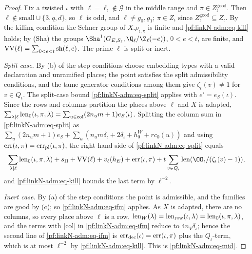 \begin{proof}
Fix a twisted $\iota$ with $\ell=\ell_\iota\notin\mathcal G$ in the middle range and $\pi\in Z^{\mathrm{good}}_\iota$. Then
$\ell\notin\mathrm{small}\cup\{3,q,d\}$, so $\ell$ is odd, and $\ell\ne g_0,g_1$; $\pi\in Z_\iota$ since
$Z^{\mathrm{good}}_\iota\subseteq Z_\iota$. By the killing condition the Selmer group of $X.\rho_{\iota,\pi}$ is finite and
\eqref{pf:linkN-adm:eq-kill} holds; by (Sha) the groups $\Sha^1(G_{E,S_\ell},\Q_\ell/\Z_\ell(-e))$,
$0<e<t$, are finite, and $\mathrm{VV}(\ell)=\sum_{0<e<t}\mathrm{sh}(\ell,e)$. The prime $\ell$ is split or inert.

\emph{Split case.} By (b) of the step conditions choose embedding types with a valid declaration and unramified places;
the point satisfies the split admissibility conditions, and the tame generator conditions among them give
$\zeta_\iota(v)\ne1$ for $v\in Q_\iota$. The split-case bound \eqref{pf:linkN-adm:eq-split} applies with $e'=e_S(\iota)$.
Since the rows and columns partition the places above $\ell$ and $X$ is adapted,
$\sum_{\lambda\mid\ell}\operatorname{len}_0(\iota,\pi,\lambda)=\sum_{u\in\mathrm{col}}(2n_um+1)e_S(\iota)$. Splitting the column sum
in \eqref{pf:linkN-adm:eq-split} as $\sum_{u}(2n_um+1)e_S+\sum_u(n_um\delta_\iota+2\delta_\iota+h^W_0+rc_0(u))$ and using
$\operatorname{err}(\iota,\pi)=\operatorname{err}_{\mathrm{pl}}(\iota,\pi)$, the right-hand side of \eqref{pf:linkN-adm:eq-split} equals
\[
\sum_{\lambda\mid\ell}\linkNadmlen_0(\iota,\pi,\lambda)+\linkNadmsP+\linkNadmVV(\ell)+v_\ell(h_E)+\linkNadmerr(\iota,\pi)
+t\sum_{v\in Q_\iota}\linkNadmlen(\OO_\iota/(\zeta_\iota(v)-1)),
\]
and \eqref{pf:linkN-adm:eq-kill} bounds the last term by $\ell^{-2}$.

\emph{Inert case.} By (a) of the step conditions the point is admissible, and the families are good by (c); so
\eqref{pf:linkN-adm:eq-ifm} applies. As $X$ is adapted, there are no columns, so every place above $\ell$ is a row,
$\operatorname{len}_W(\lambda)=\operatorname{len}_{\mathrm{row}}(\iota,\lambda)=\operatorname{len}_0(\iota,\pi,\lambda)$, and the terms with
$|\mathrm{col}|$ in \eqref{pf:linkN-adm:eq-ifm} reduce to $4n_V\delta_\iota$; hence the second line of
\eqref{pf:linkN-adm:eq-ifm} is $\operatorname{err}_{\mathrm{dec}}(\iota)=\operatorname{err}(\iota,\pi)$ plus the $Q_\iota$-term, which is at
most $\ell^{-2}$ by \eqref{pf:linkN-adm:eq-kill}. This is \eqref{pf:linkN-adm:eq-mid}.
\end{proof}

